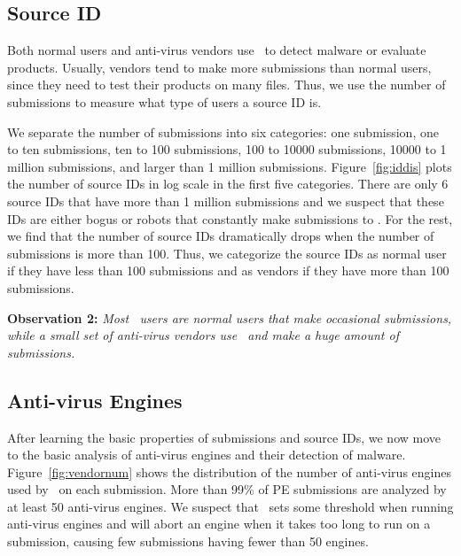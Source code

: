 \subsection{Source ID}
\label{sec:source_id}

%

Both normal users and anti-virus vendors use \vt\ to detect malware or evaluate products.
Usually, vendors tend to make more submissions than normal users, since they need to test their products on many files.
Thus, we use the number of submissions to measure what type of users a source ID is.

We separate the number of submissions into six categories:
one submission, one to ten submissions, ten to 100 submissions, 100 to 10000 submissions, 10000 to 1 million submissions, and larger than 1 million submissions.
Figure~\ref{fig:iddis} plots the number of source IDs in log scale in the first five categories.
There are only 6 source IDs that have more than 1 million submissions and we suspect that these IDs are either bogus or robots 
that constantly make submissions to \vt.
For the rest, we find that the number of source IDs dramatically drops when the number of submissions is more than 100.
Thus, we categorize the source IDs as normal user if they have less than 100 submissions and as vendors if they have more than 100 submissions.

{\bf Observation 2:} 
{\em Most \vt\ users are normal users that make occasional submissions, while a small set of anti-virus vendors use \vt\ and make a huge amount of submissions.}



\subsection{Anti-virus Engines}

%
%



After learning the basic properties of submissions and source IDs, 
we now move to the basic analysis of anti-virus engines and their detection of malware.
Figure~\ref{fig:vendornum} shows the distribution of the number of anti-virus engines used by \vt\ on each submission. 
More than 99\% of PE submissions are analyzed by at least 50 anti-virus engines. 
We suspect that \vt\ sets some threshold when running anti-virus engines and 
will abort an engine when it takes too long to run on a submission,
causing few submissions having fewer than 50 engines.

